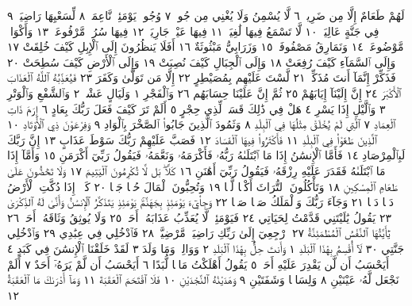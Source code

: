 لَهُمْ طَعَامٌ إِلَّا مِن ضَرِيعࣲ ٦ لَّا يُسْمِنُ وَلَا يُغْنِي مِن جُوعࣲ ٧ وُجُوهࣱ
يَوْمَئِذࣲ نَّاعِمَةࣱ ٨ لِّسَعْيِهَا رَاضِيَةࣱ ٩ فِي جَنَّةٍ عَالِيَةࣲ ١٠ لَّا تَسْمَعُ
فِيهَا لَٰغِيَةࣰ ١١ فِيهَا عَيْنࣱ جَارِيَةࣱ ١٢ فِيهَا سُرُرࣱ مَّرْفُوعَةࣱ ١٣ وَأَكْوَابࣱ
مَّوْضُوعَةࣱ ١٤ وَنَمَارِقُ مَصْفُوفَةࣱ ١٥ وَزَرَابِيُّ مَبْثُوثَةٌ ١٦ أَفَلَا يَنظُرُونَ
إِلَى ٱلْإِبِلِ كَيْفَ خُلِقَتْ ١٧ وَإِلَى ٱلسَّمَآءِ كَيْفَ رُفِعَتْ ١٨ وَإِلَى
ٱلْجِبَالِ كَيْفَ نُصِبَتْ ١٩ وَإِلَى ٱلْأَرْضِ كَيْفَ سُطِحَتْ ٢٠
فَذَكِّرْ إِنَّمَآ أَنتَ مُذَكِّرࣱ ٢١ لَّسْتَ عَلَيْهِم بِمُصَيْطِرٍ ٢٢
إِلَّا مَن تَوَلَّىٰ وَكَفَرَ ٢٣ فَيُعَذِّبُهُ ٱللَّهُ ٱلْعَذَابَ ٱلْأَكْبَرَ ٢٤
إِنَّ إِلَيْنَآ إِيَابَهُمْ ٢٥ ثُمَّ إِنَّ عَلَيْنَا حِسَابَهُم ٢٦
وَٱلْفَجْرِ ١ وَلَيَالٍ عَشْرࣲ ٢ وَٱلشَّفْعِ وَٱلْوَتْرِ ٣ وَٱلَّيْلِ إِذَا يَسْرِ ٤
هَلْ فِي ذَٰلِكَ قَسَمࣱ لِّذِي حِجْرٍ ٥ أَلَمْ تَرَ كَيْفَ فَعَلَ رَبُّكَ بِعَادٍ ٦
إِرَمَ ذَاتِ ٱلْعِمَادِ ٧ ٱلَّتِي لَمْ يُخْلَقْ مِثْلُهَا فِي ٱلْبِلَٰدِ ٨ وَثَمُودَ ٱلَّذِينَ
جَابُوا۟ ٱلصَّخْرَ بِٱلْوَادِ ٩ وَفِرْعَوْنَ ذِي ٱلْأَوْتَادِ ١٠ ٱلَّذِينَ طَغَوْا۟ فِي
ٱلْبِلَٰدِ ١١ فَأَكْثَرُوا۟ فِيهَا ٱلْفَسَادَ ١٢ فَصَبَّ عَلَيْهِمْ رَبُّكَ سَوْطَ
عَذَابٍ ١٣ إِنَّ رَبَّكَ لَبِٱلْمِرْصَادِ ١٤ فَأَمَّا ٱلْإِنسَٰنُ إِذَا مَا ٱبْتَلَىٰهُ
رَبُّهُۥ فَأَكْرَمَهُۥ وَنَعَّمَهُۥ فَيَقُولُ رَبِّيٓ أَكْرَمَنِ ١٥ وَأَمَّآ إِذَا مَا ٱبْتَلَىٰهُ
فَقَدَرَ عَلَيْهِ رِزْقَهُۥ فَيَقُولُ رَبِّيٓ أَهَٰنَنِ ١٦ كَلَّاۖ بَل لَّا تُكْرِمُونَ
ٱلْيَتِيمَ ١٧ وَلَا تَحَٰٓضُّونَ عَلَىٰ طَعَامِ ٱلْمِسْكِينِ ١٨ وَتَأْكُلُونَ
ٱلتُّرَاثَ أَكْلࣰا لَّمࣰّا ١٩ وَتُحِبُّونَ ٱلْمَالَ حُبࣰّا جَمࣰّا ٢٠ كَلَّآۖ إِذَا
دُكَّتِ ٱلْأَرْضُ دَكࣰّا دَكࣰّا ٢١ وَجَآءَ رَبُّكَ وَٱلْمَلَكُ صَفࣰّا صَفࣰّا ٢٢
وَجِا۟يٓءَ يَوْمَئِذِۭ بِجَهَنَّمَۚ يَوْمَئِذࣲ يَتَذَكَّرُ ٱلْإِنسَٰنُ وَأَنَّىٰ
لَهُ ٱلذِّكْرَىٰ ٢٣ يَقُولُ يَٰلَيْتَنِي قَدَّمْتُ لِحَيَاتِي ٢٤ فَيَوْمَئِذࣲ
لَّا يُعَذِّبُ عَذَابَهُۥٓ أَحَدࣱ ٢٥ وَلَا يُوثِقُ وَثَاقَهُۥٓ أَحَدࣱ ٢٦ يَٰٓأَيَّتُهَا
ٱلنَّفْسُ ٱلْمُطْمَئِنَّةُ ٢٧ ٱرْجِعِيٓ إِلَىٰ رَبِّكِ رَاضِيَةࣰ مَّرْضِيَّةࣰ ٢٨
فَٱدْخُلِي فِي عِبَٰدِي ٢٩ وَٱدْخُلِي جَنَّتِي ٣٠
لَآ أُقْسِمُ بِهَٰذَا ٱلْبَلَدِ ١ وَأَنتَ حِلُّۢ بِهَٰذَا ٱلْبَلَدِ ٢ وَوَالِدࣲ وَمَا وَلَدَ ٣
لَقَدْ خَلَقْنَا ٱلْإِنسَٰنَ فِي كَبَدٍ ٤ أَيَحْسَبُ أَن لَّن يَقْدِرَ عَلَيْهِ
أَحَدࣱ ٥ يَقُولُ أَهْلَكْتُ مَالࣰا لُّبَدًا ٦ أَيَحْسَبُ أَن لَّمْ يَرَهُۥٓ أَحَدٌ ٧
أَلَمْ نَجْعَل لَّهُۥ عَيْنَيْنِ ٨ وَلِسَانࣰا وَشَفَتَيْنِ ٩ وَهَدَيْنَٰهُ
ٱلنَّجْدَيْنِ ١٠ فَلَا ٱقْتَحَمَ ٱلْعَقَبَةَ ١١ وَمَآ أَدْرَىٰكَ مَا ٱلْعَقَبَةُ ١٢
